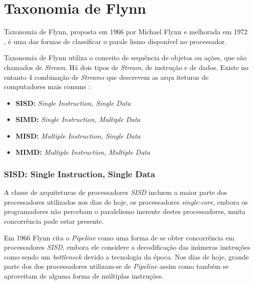 \chapter{Taxonomia de Flynn}

\noindent Taxonomia de Flynn, proposta em 1966 \cite{flynn1966} por Michael 
Flynn e melhorada em 1972 \cite{flynn1972}, é uma das formas de classificar o 
parale lismo disponível no processador.  


Taxonomia de Flynn utiliza o conceito de sequência de objetos ou ações, que são
chamados de \textit{Stream}. Há dois tipos de \textit{Stream}, de instrução e 
de dados. Existe no entanto 4 combinação de \textit{Streams} que descrevem as 
arqu iteturas de computadores mais comuns \cite{Flynn1996}:

\begin{itemize}
        \item \textbf{SISD:} \textit{Single Instruction, Single Data}
        \item \textbf{SIMD:} \textit{Single Instruction, Multiple Data}
        \item \textbf{MISD:} \textit{Multiple Instruction, Single Data}
        \item \textbf{MIMD:} \textit{Multiple Instruction, Multiple Data}
\end{itemize}

\subsection{SISD: Single Instruction, Single Data}

\noindent A classe de arquiteturas de processadores \textit{SISD} incluem a 
maior parte dos processadores utilizados nos dias de hoje, os processadores 
\textit{single-core}, embora os programadores não percebam o paralelismo 
inerente destes processadores, muita concorrência pode estar presente.  

Em 1966 Flynn cita o \textit{Pipeline} como uma forma de se obter concorrência 
em processadores \textit{SISD}, embora ele considere a decodificação das 
inúmeras instruções como sendo um \textit{bottleneck} devido a tecnologia da 
época. Nos dias de hoje, grande parte dos dos processadores utilizam-se de 
\textit{Pipeline} assim como também se aproveitam de alguma forma de múltiplas 
instruções.  

